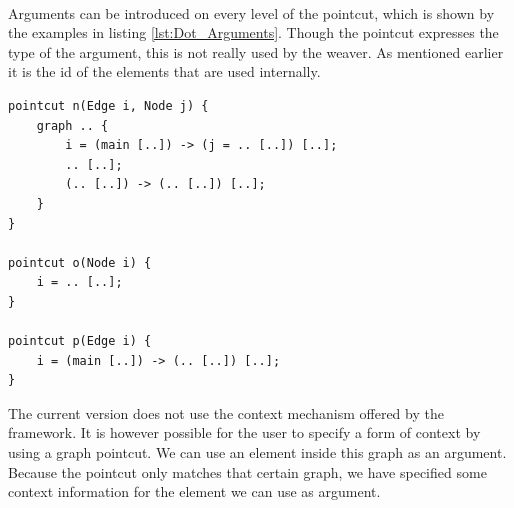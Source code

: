 \documentclass[a4paper]{report}
\begin{document}
\\
Arguments can be introduced on every level of the pointcut, which is shown by the examples in listing \ref{lst:Dot_Arguments}. Though the pointcut expresses the type of the argument, this is not really used by the weaver. As mentioned earlier it is the id of the elements that are used internally.
\begin{lstlisting}[caption=Examples showing the use of arguments, label=lst:Dot_Arguments]
pointcut n(Edge i, Node j) {
	graph .. {
		i = (main [..]) -> (j = .. [..]) [..];
		.. [..];
		(.. [..]) -> (.. [..]) [..];
	}
}

pointcut o(Node i) {
	i = .. [..];
}

pointcut p(Edge i) {
	i = (main [..]) -> (.. [..]) [..];
}
\end{lstlisting}
The current version does not use the context mechanism offered by the framework. It is however possible for the user to specify a form of context by using a graph pointcut. We can use an element inside this graph as an argument. Because the pointcut only matches that certain graph, we have specified some context information for the element we can use as argument.
\end{document}
